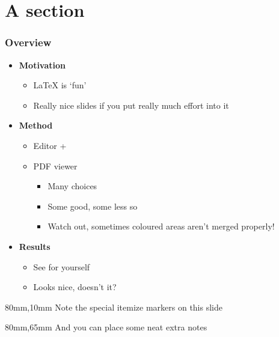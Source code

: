 \documentclass[mathserif, fleqn]{beamer}
\begin{document}
\begin{frame}
  \titlepage
\end{frame}

\section{A section}
\begin{frame}\frametitle{Overview}

  \begin{itemize}\setlength{\itemsep}{1.5ex}
  \item \textbf{Motivation}
    \begin{itemize}\setlength{\itemsep}{1ex}
    \item \LaTeX{} is `fun'
    \item Really nice slides if you put really much effort into it
    \end{itemize}
  \item \textbf{Method}
    \begin{itemize}\setlength{\itemsep}{1ex}
    \item Editor + \XeLaTeX
    \item PDF viewer
      \begin{itemize}
      \item Many choices
      \item Some good, some less so
      \item Watch out, sometimes coloured areas aren't merged properly!
      \end{itemize}
    \end{itemize}
  \item \textbf{Results}
    \begin{itemize}\setlength{\itemsep}{1ex}
    \item See for yourself
    \item Looks nice, doesn't it?
    \end{itemize}
  \end{itemize}

  \begin{aside}{40mm}{80mm,10mm}
    Note the special itemize markers on this slide
  \end{aside}

  \begin{aside}{30mm}{80mm,65mm}
    And you can place some neat extra notes
  \end{aside}
\end{frame}
\end{document}
